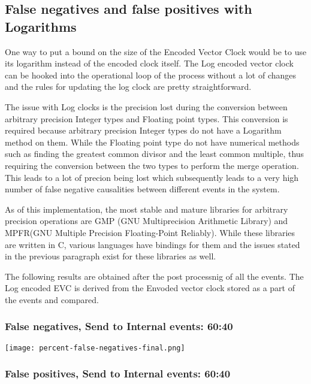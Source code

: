 \documentclass[]{article}
\begin{document}
\hypertarget{false-negatives-and-false-positives-with-logarithms}{%
\subsection{False negatives and false positives with
Logarithms}\label{false-negatives-and-false-positives-with-logarithms}}

One way to put a bound on the size of the Encoded Vector Clock would be
to use its logarithm instead of the encoded clock itself. The Log
encoded vector clock can be hooked into the operational loop of the
process without a lot of changes and the rules for updating the log
clock are pretty straightforward.

The issue with Log clocks is the precision lost during the conversion
between arbitrary precision Integer types and Floating point types. This
conversion is required because arbitrary precision Integer types do not
have a Logarithm method on them. While the Floating point type do not
have numerical methods such as finding the greatest common divisor and
the least common multiple, thus requiring the conversion between the two
types to perform the merge operation. This leads to a lot of precion
being lost which subsequently leads to a very high number of false
negative causalities between different events in the system.

As of this implementation, the most stable and mature libraries for
arbitrary precision operations are GMP (GNU Multiprecision Arithmetic
Library) and MPFR(GNU Multiple Precision Floating-Point Reliably). While
these libraries are written in C, various languages have bindings for
them and the issues stated in the previous paragraph exist for these
libraries as well.

The following results are obtained after the post processnig of all the
events. The Log encoded EVC is derived from the Envoded vector clock
stored as a part of the events and compared.

\hypertarget{false-negatives-send-to-internal-events-6040}{%
\subsubsection{False negatives, Send to Internal events:
60:40}\label{false-negatives-send-to-internal-events-6040}}

\texttt{[image: percent-false-negatives-final.png]}

\hypertarget{false-positives-send-to-internal-events-6040}{%
\subsubsection{False positives, Send to Internal events:
60:40}\label{false-positives-send-to-internal-events-6040}}
\end{document}
